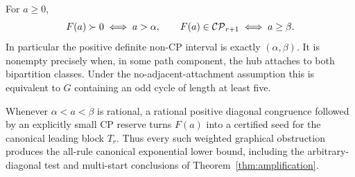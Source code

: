 \begin{theorem}\label{thm:seedinterval}
For $a\ge0$,
\[
 F(a)\succ0\iff a>\alpha,\qquad
 F(a)\in\mathcal{CP}_{r+1}\iff a\ge\beta.
\]
In particular the positive definite non-CP interval is exactly $(\alpha,\beta)$. It is nonempty precisely when, in some path component, the hub attaches to both bipartition classes. Under the no-adjacent-attachment assumption this is equivalent to $G$ containing an odd cycle of length at least five.

Whenever $\alpha<a<\beta$ is rational, a rational positive diagonal congruence followed by an explicitly small CP reserve turns $F(a)$ into a certified seed for the canonical leading block $T_r$. Thus every such weighted graphical obstruction produces the all-rule canonical exponential lower bound, including the arbitrary-diagonal test and multi-start conclusions of Theorem~\ref{thm:amplification}.
\end{theorem}
